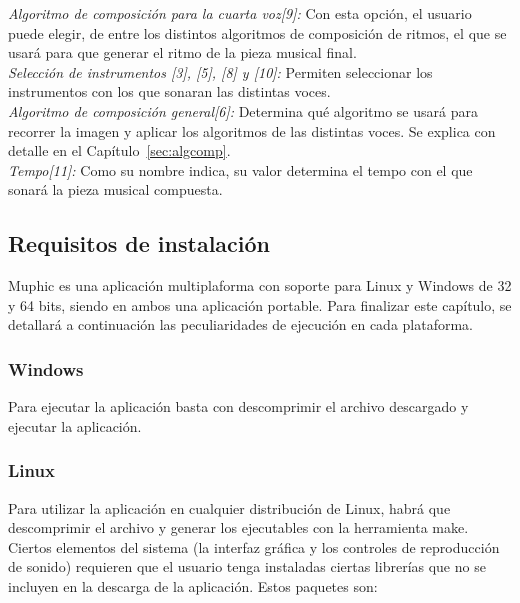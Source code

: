 		\noindent\textit{Algoritmo de composición para la cuarta voz[9]:} Con esta opción, el usuario puede elegir, de entre los distintos algoritmos de composición de ritmos, el que se usará para que generar el ritmo de la pieza musical final.\\
		
		\noindent\textit{Selección de instrumentos [3], [5], [8] y [10]:} Permiten seleccionar los instrumentos con los que sonaran las distintas voces.\\

		\noindent\textit{Algoritmo de composición general[6]:} Determina qué algoritmo se usará para recorrer la imagen y aplicar los algoritmos de las distintas voces. Se explica con detalle en el Capítulo~\ref{sec:algcomp}.\\

		\noindent\textit{Tempo[11]:} Como su nombre indica, su valor determina el tempo con el que sonará la pieza musical compuesta.\\
		
	\subsection{Requisitos de instalación}
	
		Muphic es una aplicación multiplaforma con soporte para Linux y Windows de 32 y 64 bits, siendo en ambos una aplicación portable. Para finalizar este capítulo, se detallará a continuación las peculiaridades de ejecución en cada plataforma.
		
		\subsubsection{Windows}
		
		Para ejecutar la aplicación basta con descomprimir el archivo descargado y ejecutar la aplicación.
		
		\subsubsection{Linux}
		
		Para utilizar la aplicación en cualquier distribución de Linux, habrá que descomprimir el archivo y generar los ejecutables con la herramienta make. Ciertos elementos del sistema (la interfaz gráfica y los controles de reproducción de sonido) requieren que el usuario tenga instaladas ciertas librerías que no se incluyen en la descarga de la aplicación. Estos paquetes son:
		

